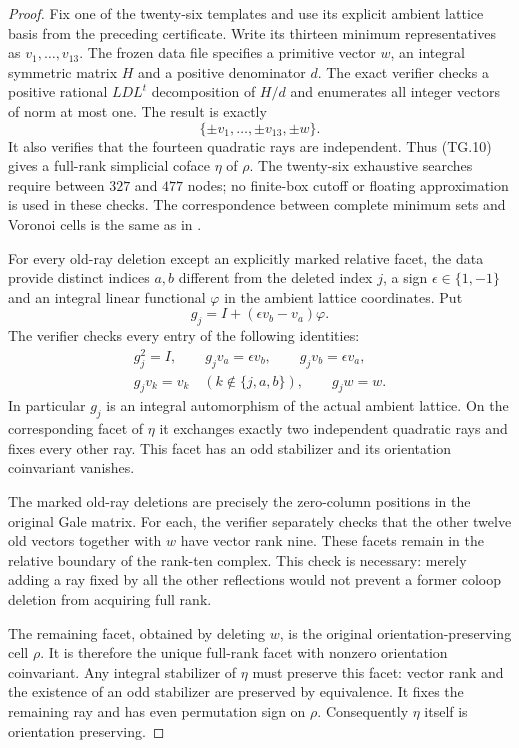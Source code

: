 \documentclass[11pt,a4paper]{article}
\theoremstyle{definition}
\begin{document}
\begin{proof}
Fix one of the twenty-six templates and use its explicit ambient
lattice basis from the preceding certificate. Write its thirteen
minimum representatives as $v_1,\ldots,v_{13}$.
The frozen data file 
specifies a primitive vector $w$, an integral symmetric matrix $H$
and a positive denominator $d$. The exact verifier checks a positive
rational $LDL^t$ decomposition of $H/d$ and enumerates all integer
vectors of norm at most one. The result is exactly
\[
             \{\pm v_1,\ldots,\pm v_{13},\pm w\}.              \tag{TG.10}
\]
It also verifies that the fourteen quadratic rays are independent.
Thus (TG.10) gives a full-rank simplicial coface $\eta$ of $\rho$.
The twenty-six exhaustive searches require between $327$ and $477$
nodes; no finite-box cutoff or floating approximation is used in
these checks. The correspondence between complete minimum sets and
Voronoi cells is the same as in
\cite[\S1.2.1, p.~4; \S2.1, p.~6]{DEKM2026}.

For every old-ray deletion except an explicitly marked relative
facet, the data provide distinct indices $a,b$ different from the
deleted index $j$, a sign $\epsilon\in\{1,-1\}$ and an integral
linear functional $\varphi$ in the ambient lattice coordinates.
Put
\[
       g_j=I+(\epsilon v_b-v_a)\varphi.                         \tag{TG.11}
\]
The verifier checks every entry of the following identities:
\[
\begin{gathered}
g_j^2=I,\qquad g_jv_a=\epsilon v_b,\qquad
g_jv_b=\epsilon v_a,\\
g_jv_k=v_k\quad(k\notin\{j,a,b\}),\qquad g_jw=w.
\end{gathered}                                                  \tag{TG.12}
\]
In particular $g_j$ is an integral automorphism of the actual ambient
lattice. On the corresponding facet of $\eta$ it exchanges exactly
two independent quadratic rays and fixes every other ray. This
facet has an odd stabilizer and its orientation coinvariant vanishes.

The marked old-ray deletions are precisely the zero-column positions
in the original Gale matrix. For each, the verifier separately checks
that the other twelve old vectors together with $w$ have vector rank
nine. These facets remain in the relative boundary of the rank-ten
complex. This check is necessary: merely adding a ray fixed by all
the other reflections would not prevent a former coloop deletion
from acquiring full rank.

The remaining facet, obtained by deleting $w$, is the original
orientation-preserving cell $\rho$. It is therefore the unique
full-rank facet with nonzero orientation coinvariant. Any integral
stabilizer of $\eta$ must preserve this facet: vector rank and the
existence of an odd stabilizer are preserved by equivalence. It fixes
the remaining ray and has even permutation sign on $\rho$.
Consequently $\eta$ itself is orientation preserving.


\end{proof}
\end{document}
